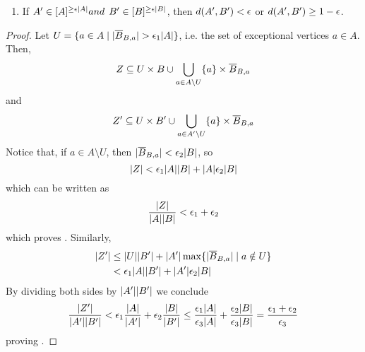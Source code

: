 \begin{lemma}[Lemma 5.17]
\begin{enumerate}[label=\alph*., ref=\alph*]
                \item \label{itm:excellence_implies_regularity.b} If $A' \in [ A ]^{\geq \epsilon | A |} and $
                    $B' \in [ B ]^{\geq \epsilon | B |}$, then $d ( A',B' ) < \epsilon$ or
                    $d ( A',B' ) \geq 1 - \epsilon$.
            \end{enumerate}
            \begin{proof}
                Let $U = \{ a \in A \mid | \overline{B}_{B,a} | > \epsilon_1 | A | \}$, i.e. the set
                of exceptional vertices $a \in A$.
                Then,
                \[
                    Z \subseteq U \times B \cup \bigcup_{a \in A \setminus U} \{ a \} \times \overline{B}_{B,a}
                \]
                and
                \[
                    Z' \subseteq U \times B' \cup \bigcup_{a \in A' \setminus U} \{ a \} \times \overline{B}_{B,a}
                \]
                Notice that, if $a \in A \setminus U$, then $| \overline{B}_{B,a} | < \epsilon_2 | B |$, so
                \[
                    | Z | < \epsilon_1 | A | | B | + | A | \epsilon_2 | B |
                \]
                which can be written as
                \[
                        \frac{| Z |}{| A | | B |} < \epsilon_1 + \epsilon_2
                \]
                which proves .
                Similarly,
                \begin{align*}
                    | Z' | & \leq | U | | B' | + | A' | \max \{ | \overline{B}_{B,a} | \mid a \notin U \} \\
                                     & < \epsilon_1 | A | | B' | + | A' | \epsilon_2 | B |
                \end{align*}
                By dividing both sides by $| A' | | B' |$ we conclude
                \[
                    \frac{| Z' |}{| A' | | B' |} < \epsilon_1 \frac{| A |}{| A' |} + \epsilon_2 \frac{| B |}{| B' |}
                    \leq \frac{\epsilon_1 | A |}{\epsilon_3 | A |} + \frac{\epsilon_2 | B |} {\epsilon_3 | B |}
                    = \frac{\epsilon_1 + \epsilon_2}{\epsilon_3}
                \]
                proving .

\end{proof}
\end{lemma}
